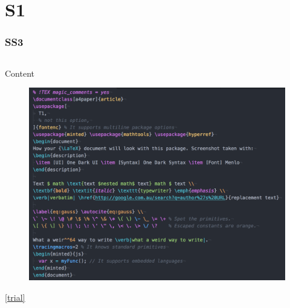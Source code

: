 \documentclass{article}
\begin{document}
\section{S1}
\subsubsection{{SS3}}


\inputminted{python}{mypy.py}


% 
Content
%
%
\begin{figure}[h t p b]
  \centering
  \includegraphics[width=\textwidth]{fig1.png}
  \caption{}
  \label{}
\end{figure}


\ref{trial}

\cites[][]{world}
\end{document}
